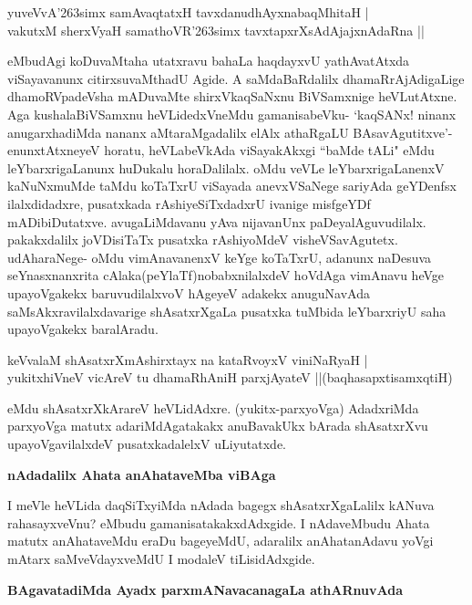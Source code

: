 \begin{shloka}
yuveVvA\char'263simx samAvaqtatxH tavxdanudhAyxnabaqMhitaH |\\
vakutxM sherxVyaH samathoVR\char'263simx tavxtapxrXsAdAjajxnAdaRna ||
\end{shloka}

\noindent
eMbudAgi koDuvaMtaha utatxravu bahaLa haqdayxvU yathAvatAtxda viSayavanunx citirxsuvaMthadU Agide. A saMdaBaRdalilx dhamaRrAjAdigaLige dhamoRVpadeVsha mADuvaMte shirxVkaqSaNxnu BiVSamxnige heVLutAtxne. Aga kushalaBiVSamxnu heVLidedxVneMdu gamanisabeVku- `kaqSANx! ninanx anugarxhadiMda nananx aMtaraMgadalilx elAlx athaRgaLU BAsavAgutitxve'- enunxtAtxneyeV horatu, heVLabeVkAda viSayakAkxgi ``baMde tALi" eMdu leYbarxrigaLanunx huDukalu horaDalilalx. oMdu veVLe leYbarxrigaLanenxV kaNuNxmuMde taMdu koTaTxrU viSayada anevxVSaNege sariyAda geYDenfsx ilalxdidadxre, pusatxkada rAshiyeSiTxdadxrU ivanige misfgeYDf mADibiDutatxve. avugaLiMdavanu yAva nijavanUnx paDeyalAguvudilalx. pakakxdalilx joVDisiTaTx pusatxka rAshiyoMdeV visheVSavAgutetx. udAharaNege- oMdu vimAnavanenxV keYge koTaTxrU, adanunx naDesuva seYnasxnanxrita cAlaka(peYlaTf)nobabxnilalxdeV hoVdAga vimAnavu heVge upayoVgakekx baruvudilalxvoV hAgeyeV adakekx anuguNavAda saMsAkxravilalxdavarige shAsatxrXgaLa pusatxka tuMbida leYbarxriyU saha upayoVgakekx baralAradu.

\begin{shloka}
keVvalaM shAsatxrXmAshirxtayx na kataRvoyxV viniNaRyaH |\\\label{164}
yukitxhiVneV vicAreV tu dhamaRhAniH parxjAyateV ||\hfill{(baqhasapxtisamxqtiH)}
\end{shloka}

\noindent
eMdu shAsatxrXkArareV heVLidAdxre. (yukitx-parxyoVga) AdadxriMda parxyoVga matutx adariMdAgatakakx anuBavakUkx bArada shAsatxrXvu upayoVgavilalxdeV pusatxkadalelxV uLiyutatxde.

\eject

{\bigskip
\noindent
{\large\bf nAdadalilx Ahata anAhataveMba viBAga}}\label{page164}
\medskip

\noindent
I meVle heVLida daqSiTxyiMda nAdada bagegx shAsatxrXgaLalilx kANuva rahasayxveVnu? eMbudu gamanisatakakxdAdxgide. I nAdaveMbudu Ahata matutx anAhataveMdu eraDu bageyeMdU, adaralilx anAhatanAdavu yoVgi mAtarx saMveVdayxveMdU I modaleV tiLisidAdxgide.

{\bigskip
\noindent
{\large\bf BAgavatadiMda Ayadx parxmANavacanagaLa athARnuvAda}}\label{page164a}
\medskip

